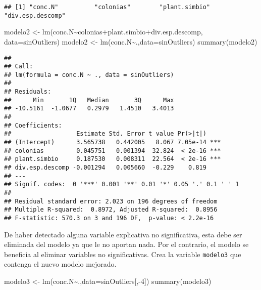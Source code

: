 \documentclass[
]{article}
\newenvironment{Shaded}{}{}
\newcommand{\AttributeTok}[1]{\textcolor[rgb]{0.49,0.56,0.16}{#1}}
\newcommand{\DecValTok}[1]{\textcolor[rgb]{0.25,0.63,0.44}{#1}}
\newcommand{\FunctionTok}[1]{\textcolor[rgb]{0.02,0.16,0.49}{#1}}
\newcommand{\NormalTok}[1]{#1}
\newcommand{\OtherTok}[1]{\textcolor[rgb]{0.00,0.44,0.13}{#1}}
\newcommand{\SpecialCharTok}[1]{\textcolor[rgb]{0.25,0.44,0.63}{#1}}
\begin{document}
\begin{verbatim}
## [1] "conc.N"          "colonias"        "plant.simbio"    "div.esp.descomp"
\end{verbatim}

\begin{Shaded}
\begin{Highlighting}[]
\NormalTok{modelo2 }\OtherTok{\textless{}{-}} \FunctionTok{lm}\NormalTok{(conc.N}\SpecialCharTok{\textasciitilde{}}\NormalTok{colonias}\SpecialCharTok{+}\NormalTok{plant.simbio}\SpecialCharTok{+}\NormalTok{div.esp.descomp, }\AttributeTok{data=}\NormalTok{sinOutliers)}
\NormalTok{modelo2 }\OtherTok{\textless{}{-}} \FunctionTok{lm}\NormalTok{(conc.N}\SpecialCharTok{\textasciitilde{}}\NormalTok{.,}\AttributeTok{data=}\NormalTok{sinOutliers)}
\FunctionTok{summary}\NormalTok{(modelo2)}
\end{Highlighting}
\end{Shaded}

\begin{verbatim}
## 
## Call:
## lm(formula = conc.N ~ ., data = sinOutliers)
## 
## Residuals:
##      Min       1Q   Median       3Q      Max 
## -10.5161  -1.0677   0.2979   1.4510   3.4013 
## 
## Coefficients:
##                  Estimate Std. Error t value Pr(>|t|)    
## (Intercept)      3.565738   0.442005   8.067 7.05e-14 ***
## colonias         0.045751   0.001394  32.824  < 2e-16 ***
## plant.simbio     0.187530   0.008311  22.564  < 2e-16 ***
## div.esp.descomp -0.001294   0.005660  -0.229    0.819    
## ---
## Signif. codes:  0 '***' 0.001 '**' 0.01 '*' 0.05 '.' 0.1 ' ' 1
## 
## Residual standard error: 2.023 on 196 degrees of freedom
## Multiple R-squared:  0.8972, Adjusted R-squared:  0.8956 
## F-statistic: 570.3 on 3 and 196 DF,  p-value: < 2.2e-16
\end{verbatim}

De haber detectado alguna variable explicativa no significativa, esta
debe ser eliminada del modelo ya que le no aportan nada. Por el
contrario, el modelo se beneficia al eliminar variables no
significativas. Crea la variable \texttt{modelo3} que contenga el nuevo
modelo mejorado.

\begin{Shaded}
\begin{Highlighting}[]
\NormalTok{modelo3 }\OtherTok{\textless{}{-}} \FunctionTok{lm}\NormalTok{(conc.N}\SpecialCharTok{\textasciitilde{}}\NormalTok{.,}\AttributeTok{data=}\NormalTok{sinOutliers[,}\SpecialCharTok{{-}}\DecValTok{4}\NormalTok{])}
\FunctionTok{summary}\NormalTok{(modelo3)}
\end{Highlighting}
\end{Shaded}
\end{document}
